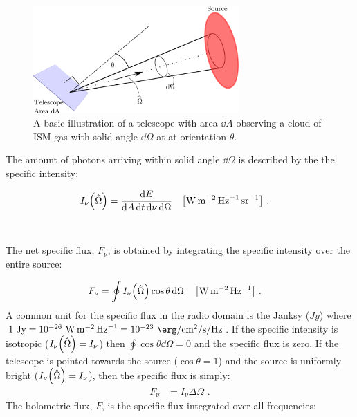 \begin{figure}
	\centering
	\includegraphics[width=0.7\textwidth]{06_Interstellar_Medium/Images/Theory/intensity.png}
	\caption{A basic illustration of a telescope with area $\dd{A}$ observing a cloud of ISM gas with solid angle $\dd{\Omega}$ at at orientation $\theta$.}
	\label{fig:telescope_basic_diagram2}
\end{figure}
\noindent The amount of photons arriving within solid angle $\dd{\Omega}$ is described by the the specific intensity:

\begin{equation}
	\begin{aligned}
		I_\nu\qty(\hat{\Omega})&=\frac{\dd{E}}{\dd{A}\dd{t}\dd{\nu}\dd{\Omega}}\quad\qty[\si{\watt\per\meter\squared\per\hertz\per\steradian}]\text{ .}
	\end{aligned}
\end{equation}
\par~\par 
\noindent The net specific flux, $F_\nu$, is obtained by integrating the specific intensity over the entire source:

\begin{equation}
	\begin{aligned}
		F_\nu &=\oint I_\nu\qty(\hat{\Omega})\cos\theta\dd{\Omega}\quad\qty[\si{\watt\per\meter\squared\per\hertz}]\text{ .}
	\end{aligned}
\end{equation}
\noindent A common unit for the specific flux in the radio domain is the Janksy ($\si{Jy}$) where $1~\si{Jy}=10^{-26}~\si{\watt\per\meter\squared\per\hertz} = 10^{-23}~\si{\erg\per\centi\meter\squared\per\second\per\hertz}$. If the specific intensity is isotropic ($I_\nu\qty(\hat{\Omega})=I_\nu$) then $\oint \cos\theta\dd{\Omega}=0$ and the specific flux is zero. If the telescope is pointed towards the source ($\cos\theta=1$) and the source is uniformly bright ($I_\nu\qty(\hat{\Omega})=I_\nu$), then the specific flux is simply:
\begin{equation}
	\begin{aligned}
		F_\nu&=I_\nu\Delta\Omega\text{ .}
	\end{aligned}\label{eq:specifc_flux_uniform_source}
\end{equation}
\noindent The bolometric flux, $F$, is the specific flux integrated over all frequencies:

